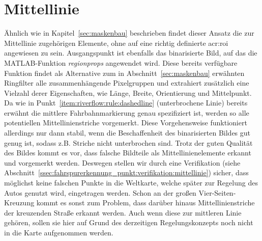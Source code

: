 \section{Mittellinie \dcfirstauthorshort}
\label{ssec:fahrspurerkennung:riverflow:mittellinie}
Ähnlich wie in Kapitel~\ref{sec:maskenbau} beschrieben findet dieser Ansatz die zur Mittellinie zugehörigen Elemente, ohne auf eine richtig definierte \gls{acr:roi} angewiesen zu sein. Ausgangspunkt ist ebenfalls das binarisierte Bild, auf das die MATLAB-Funktion \emph{regionprops} angewendet wird. Diese bereits verfügbare Funktion findet als Alternative zum in Abschnitt~\ref{sec:maskenbau} erwähnten \glqq Ringfilter\grqq{} alle zusammenhängende Pixelgruppen und extrahiert zusätzlich eine Vielzahl derer Eigenschaften, wie Länge, Breite, Orientierung und Mittelpunkt. Da wie in Punkt~\ref{item:riverflow:rule:dashedline} (unterbrochene Linie) bereits erwähnt die mittlere Fahrbahnmarkierung genau spezifiziert ist, werden so alle potentiellen Mittellinienstriche vorgemerkt. Diese Vorgehensweise funktioniert allerdings nur dann stabil, wenn die Beschaffenheit des binarisierten Bildes gut genug ist, sodass z.B. Striche nicht unterbrochen sind. Trotz der guten Qualität des Bildes kommt es vor, dass falsche Bildteile als Mittellinienelemente erkannt und vorgemerkt werden. Deswegen stellen wir durch eine Verifikation (siehe Abschnitt~\ref{ssec:fahrspurerkennung_punkt:verifikation:mittellinie}) sicher, dass möglichst keine falschen Punkte in die Weltkarte, welche später zur Regelung des Autos genutzt wird, eingetragen werden. Schon an der großen Vier-Seiten-Kreuzung kommt es sonst zum Problem, dass darüber hinaus Mittellinienstriche der kreuzenden Straße erkannt werden. Auch wenn diese zur mittleren Linie gehören, sollen sie hier auf Grund des derzeitigen Regelungskonzepts noch nicht in die Karte aufgenommen werden. 

